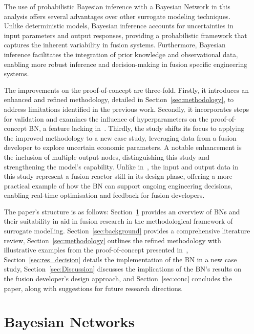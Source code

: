 \documentclass[journal]{IEEEtran}
\begin{document}
The use of probabilistic Bayesian inference with a Bayesian Network in this analysis offers several advantages over other surrogate modeling techniques. Unlike deterministic models, Bayesian inference accounts for uncertainties in input parameters and output responses, providing a probabilistic framework that captures the inherent variability in fusion systems. Furthermore, Bayesian inference facilitates the integration of prior knowledge and observational data, enabling more robust inference and decision-making in fusion specific engineering systems.

The improvements on the proof-of-concept are three-fold. Firstly, it introduces an enhanced and refined methodology, detailed in Section~\ref{sec:methodology}, to address limitations identified in the previous work. Secondly, it incorporates steps for validation and examines the influence of hyperparameters on the proof-of-concept BN, a feature lacking in~\cite{Griffiths2024}. Thirdly, the study shifts its focus to applying the improved methodology to a new case study, leveraging data from a fusion developer to explore uncertain economic parameters. A notable enhancement is the inclusion of multiple output nodes, distinguishing this study and strengthening the model's capability. Unlike in~\cite{Griffiths2024}, the input and output data in this study represent a fusion reactor still in its design phase, offering a more practical example of how the BN can support ongoing engineering decisions, enabling real-time optimisation and feedback for fusion developers.

The paper's structure is as follows: Section~\ref{sec:BNs} provides an overview of BNs and their suitability in aid in fusion research in the methodological framework of surrogate modelling. Section~\ref{sec:background} provides a comprehensive literature review, Section~\ref{sec:methodology} outlines the refined methodology with illustrative examples from the proof-of-concept presented in~\cite{Griffiths2024}, Section~\ref{sec:res_decision} details the implementation of the BN in a new case study, Section~\ref{sec:Discussion} discusses the implications of the BN's results on the fusion developer's design approach, and Section~\ref{sec:conc} concludes the paper, along with suggestions for future research directions.

\section{Bayesian Networks}\label{sec:BNs}
\end{document}
